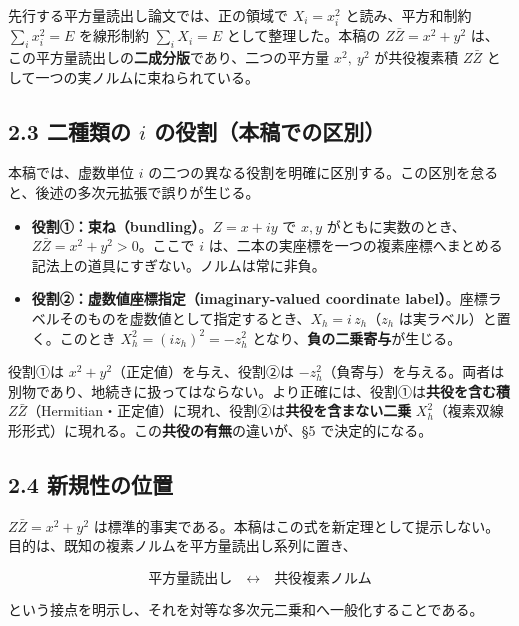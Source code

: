 \documentclass[11pt,a4paper]{ltjsarticle}
\providecommand{\tightlist}{\setlength{\itemsep}{0pt}\setlength{\parskip}{0pt}}
\begin{document}
先行する平方量読出し論文では、正の領域で \(X_i=x_i^2\)
と読み、平方和制約 \(\sum_i x_i^2=E\) を線形制約 \(\sum_i X_i=E\)
として整理した。本稿の \(Z\bar Z=x^2+y^2\)
は、この平方量読出しの\textbf{二成分版}であり、二つの平方量
\(x^2,\ y^2\) が共役複素積 \(Z\bar Z\)
として一つの実ノルムに束ねられている。

\subsection{\texorpdfstring{2.3 二種類の \(i\)
の役割（本稿での区別）}{2.3 二種類の i の役割（本稿での区別）}}\label{ux4e8cux7a2eux985eux306e-i-ux306eux5f79ux5272ux672cux7a3fux3067ux306eux533aux5225}

本稿では、虚数単位 \(i\)
の二つの異なる役割を明確に区別する。この区別を怠ると、後述の多次元拡張で誤りが生じる。

\begin{itemize}
\tightlist
\item
  \textbf{役割①：束ね（bundling）}。\(Z=x+iy\) で \(x,y\)
  がともに実数のとき、\(Z\bar Z=x^2+y^2>0\)。ここで \(i\)
  は、二本の実座標を一つの複素座標へまとめる記法上の道具にすぎない。ノルムは常に非負。
\item
  \textbf{役割②：虚数値座標指定（imaginary-valued coordinate
  label）}。座標ラベルそのものを虚数値として指定するとき、\(X_h=i\,z_h\)（\(z_h\)
  は実ラベル）と置く。このとき \(X_h^2=(i z_h)^2=-z_h^2\)
  となり、\textbf{負の二乗寄与}が生じる。
\end{itemize}

役割①は \(x^2+y^2\)（正定値）を与え、役割②は
\(-z_h^2\)（負寄与）を与える。両者は別物であり、地続きに扱ってはならない。より正確には、役割①は\textbf{共役を含む積}
\(Z\bar Z\)（Hermitian・正定値）に現れ、役割②は\textbf{共役を含まない二乗}
\(X_h^2\)（複素双線形形式）に現れる。この\textbf{共役の有無}の違いが、§5
で決定的になる。

\subsection{2.4
新規性の位置}\label{ux65b0ux898fux6027ux306eux4f4dux7f6e}

\(Z\bar Z=x^2+y^2\)
は標準的事実である。本稿はこの式を新定理として提示しない。目的は、既知の複素ノルムを平方量読出し系列に置き、

\[
\text{平方量読出し}\quad\leftrightarrow\quad\text{共役複素ノルム}
\]

という接点を明示し、それを対等な多次元二乗和へ一般化することである。
\end{document}
